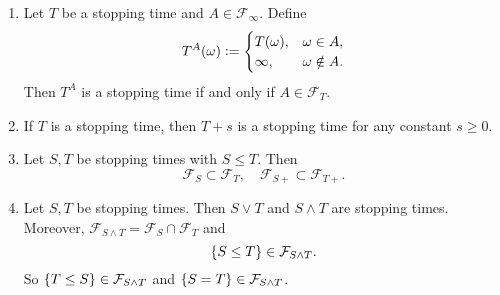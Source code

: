 \begin{prop}
    \begin{enumerate}[label=(\arabic{*})]
        \item Let $T$ be a stopping time and $A \in \mathcal{F}_\infty$. Define
        \begin{equation*}
            T^A(\omega) \vcentcolon= \begin{cases}
                T(\omega),&\omega \in A, \\
                \infty,&\omega \notin A.
            \end{cases}
        \end{equation*}
        Then $T^A$ is a stopping time if and only if $A \in \mathcal{F}_T$.

        \item If $T$ is a stopping time, then $T + s$ is a stopping time for any constant $s \geq 0$.

        \item \label{item:3_stoptime} Let $S,T$ be stopping times with $S \leq T$. Then
        \begin{equation*}
            \mathcal{F}_S \subset \mathcal{F}_T,\quad \mathcal{F}_{S+} \subset \mathcal{F}_{T+}.
        \end{equation*}

        \item Let $S,T$ be stopping times. Then $S \vee T$ and $S \wedge T$ are stopping times. Moreover, $\mathcal{F}_{S \wedge T} = \mathcal{F}_S \cap \mathcal{F}_T$ and
        \begin{equation*}
            \left\{S \leq T\right\} \in \mathcal{F}_{S \wedge T}.
        \end{equation*}
        So $\left\{T \leq S\right\} \in \mathcal{F}_{S \wedge T}$ and $\left\{S = T\right\} \in \mathcal{F}_{S \wedge T}$.
    \end{enumerate}
\end{prop}
